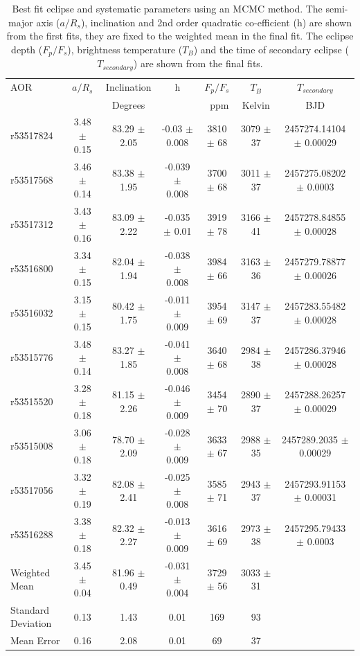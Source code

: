 \begin{landscape}
\begin{table}[]
    \centering
    \caption{Best fit eclipse and systematic parameters using an MCMC method. The semi-major axis ($a/R_s$), inclination and 2nd order quadratic co-efficient (h) are shown from the first fits, they are fixed to the weighted mean in the final fit. The eclipse depth ($F_p/F_s$), brightness temperature ($T_B$) and the time of secondary eclipse ($T_{secondary}$) are shown from the final fits.}
    \label{P3:tab:resutls}
\begin{tabular}{lccc|ccc}
\hline \hline
 AOR & $a/R_s$ & Inclination & h & $F_p/F_s$ & $T_B$ & $T_{secondary}$ \\
 &  & Degrees & &~ppm & Kelvin & BJD \\
\hline
r53517824 & 3.48 $\pm$ 0.15 &  83.29 $\pm$ 2.05 &   -0.03 $\pm$ 0.008 &  3810 $\pm$ 68 &  3079 $\pm$ 37 &  2457274.14104 $\pm$ 0.00029 \\
r53517568 & 3.46 $\pm$ 0.14 &  83.38 $\pm$ 1.95 &  -0.039 $\pm$ 0.008 &  3700 $\pm$ 68 &  3011 $\pm$ 37 &   2457275.08202 $\pm$ 0.0003 \\
r53517312 & 3.43 $\pm$ 0.16 &  83.09 $\pm$ 2.22 &   -0.035 $\pm$ 0.01 &  3919 $\pm$ 78 &  3166 $\pm$ 41 &  2457278.84855 $\pm$ 0.00028 \\
r53516800 & 3.34 $\pm$ 0.15 &  82.04 $\pm$ 1.94 &  -0.038 $\pm$ 0.008 &  3984 $\pm$ 66 &  3163 $\pm$ 36 &  2457279.78877 $\pm$ 0.00026 \\
r53516032 & 3.15 $\pm$ 0.15 &  80.42 $\pm$ 1.75 &  -0.011 $\pm$ 0.009 &  3954 $\pm$ 69 &  3147 $\pm$ 37 &  2457283.55482 $\pm$ 0.00028 \\
r53515776 & 3.48 $\pm$ 0.14 &  83.27 $\pm$ 1.85 &  -0.041 $\pm$ 0.008 &  3640 $\pm$ 68 &  2984 $\pm$ 38 &  2457286.37946 $\pm$ 0.00028 \\
r53515520 & 3.28 $\pm$ 0.18 &  81.15 $\pm$ 2.26 &  -0.046 $\pm$ 0.009 &  3454 $\pm$ 70 &  2890 $\pm$ 37 &  2457288.26257 $\pm$ 0.00029 \\
r53515008 & 3.06 $\pm$ 0.18 &   78.70 $\pm$ 2.09 &  -0.028 $\pm$ 0.009 &  3633 $\pm$ 67 &  2988 $\pm$ 35 &   2457289.2035 $\pm$ 0.00029 \\
r53517056 & 3.32 $\pm$ 0.19 &  82.08 $\pm$ 2.41 &  -0.025 $\pm$ 0.008 &  3585 $\pm$ 71 &  2943 $\pm$ 37 &  2457293.91153 $\pm$ 0.00031 \\
r53516288 & 3.38 $\pm$ 0.18 &  82.32 $\pm$ 2.27 &  -0.013 $\pm$ 0.009 &  3616 $\pm$ 69 &  2973 $\pm$ 38 &   2457295.79433 $\pm$ 0.0003 \\
\hline
Weighted Mean & 3.45 $\pm$ 0.04 & 81.96 $\pm$ 0.49 & -0.031 $\pm$ 0.004 & 3729 $\pm$ 56 & 3033 $\pm$ 31 & \\
\hline
Standard Deviation & 0.13 & 1.43 & 0.01 & 169 & 93 & \\
Mean Error & 0.16 & 2.08 & 0.01 & 69 & 37 & \\
\hline
\end{tabular}

\end{table}
\end{landscape}

